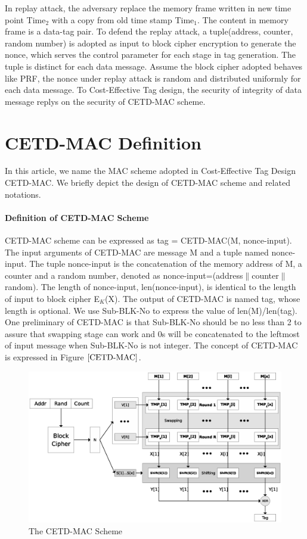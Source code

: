 \documentclass{article}
\begin{document}
In replay attack, the adversary replace the memory frame written in new time
point Time$_2$ with a copy from old time stamp Time$_1$. The content in memory
frame is a data-tag pair. To defend the replay attack, a tuple(address, counter,
random number) is adopted as input to block cipher encryption to generate the
nonce, which serves the control parameter for each stage in tag generation. The
tuple is distinct for each data message. Assume the block cipher adopted behaves
like PRF, the nonce under replay attack is random and distributed
uniformly for each data message. To Cost-Effective Tag design, the security of integrity of data message replys on the
security of CETD-MAC scheme.


\section{CETD-MAC Definition}
In this article, we name the MAC scheme adopted in Cost-Effective Tag Design\cite{} CETD-MAC. We briefly depict the design of CETD-MAC scheme and related notations.
\paragraph{Definition of CETD-MAC Scheme}
CETD-MAC scheme can be expressed as tag = CETD-MAC(M, nonce-input). The input arguments of CETD-MAC are message M and a tuple named nonce-input. The tuple nonce-input is the concatenation of the memory address of M, a counter and a random number, denoted as nonce-input=(address$\|$counter$\|$random). The length of nonce-input, len(nonce-input), is identical to the length of input to block cipher E$_K$(X). The output of CETD-MAC is named tag, whose length is optional. We use Sub-BLK-No to express the value of len(M)/len(tag). One preliminary of CETD-MAC is that Sub-BLK-No should be no less than 2 to assure that swapping stage can work and 0s will be concatenated to the leftmost of input message when Sub-BLK-No is not integer.  
The concept of CETD-MAC is expressed in Figure $\ref{CETD-MAC}$.
\begin{figure}[htbp]
 \centering
 \includegraphics[scale=0.6]{./diagrams/CETD.eps}
 \caption{The CETD-MAC Scheme}
 \label{fig:CETD-MAC}
\end{figure}
\end{document}
